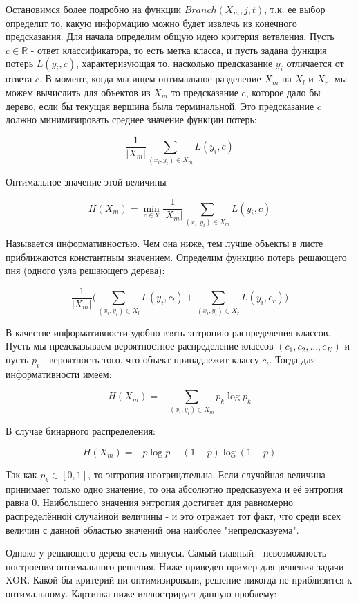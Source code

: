 Остановимся более подробно на функции $Branch(X_m, j, t)$, т.к. ее выбор определит то, какую информацию можно будет извлечь из конечного предсказания. Для начала определим общую идею критерия ветвления. Пусть $c \in \mathbb{R}$ - ответ классификатора, то есть метка класса, и пусть задана функция потерь $L(y_i, c)$, характеризующая то, насколько предсказание $y_i$ отличается от ответа $c$. В момент, когда мы ищем оптимальное разделение $X_m$ на $X_l$ и $X_r$, мы можем вычислить для объектов из $X_m$ то предсказание $c$, которое дало бы дерево, если бы текущая вершина была терминальной. Это предсказание $c$ должно минимизировать среднее значение функции потерь:

\[ \dfrac{1}{|X_m|} \displaystyle\sum_{(x_i,y_i) \in X_m} L(y_i, c) \]

Оптимальное значение этой величины

\[ H(X_m) = \min_{c \in Y} \dfrac{1}{|X_m|} \displaystyle\sum_{(x_i,y_i) \in X_m} L(y_i, c) \]

Называется информативностью. Чем она ниже, тем лучше объекты в листе приближаются константным значением. Определим функцию потерь решающего пня (одного узла решающего дерева):

\[ \dfrac{1}{|X_m|} \lparen \displaystyle\sum_{(x_i,y_i) \in X_l} L(y_i, c_l) +  \displaystyle\sum_{(x_i,y_i) \in X_r} L(y_i, c_r) \rparen \]

В качестве информативности удобно взять энтропию распределения классов. Пусть мы предсказываем вероятностное распределение классов $(c_1, c_2, ..., c_K)$ и пусть $p_i$ - вероятность того, что объект принадлежит классу $c_i$. Тогда для информативности имеем\cite{SHAD-trees}:

\[ H(X_m) = - \displaystyle\sum_{(x_i,y_i) \in X_m} p_k \log{p_k} \]

В случае бинарного распределения:

\[ H(X_m) = - p \log{p} - (1 - p) \log{(1 - p)} \]

Так как $p_k \in [0,1]$, то энтропия неотрицательна. Если случайная величина принимает только одно значение, то она абсолютно предсказуема и её энтропия равна 0. Наибольшего значения энтропия достигает для равномерно распределённой случайной величины - и это отражает тот факт, что среди всех величин с данной областью значений она наиболее "непредсказуема".

Однако у решающего дерева есть минусы. Самый главный - невозможность построения оптимального решения. Ниже приведен пример для решения задачи XOR. Какой бы критерий ни оптимизировали, решение никогда не приблизится к оптимальному. Картинка ниже иллюстрирует данную проблему:

